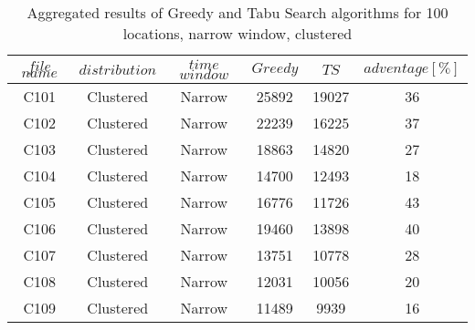\begin{table}[t]
\centering
\caption{
Aggregated results of Greedy and Tabu Search algorithms for 100 locations, narrow window, clustered}
\begin{tabular*}{0.8\linewidth}{@{\extracolsep{\fill}}cccccc}
\toprule
$file$ $name$ & $distribution$ & $time$ $window$ & $Greedy$ & $TS$ & $adventage[\%]$ \\ \midrule
C101 & Clustered & Narrow & 25892 & 19027 & 36\\
C102 & Clustered & Narrow & 22239 & 16225 & 37\\
C103 & Clustered & Narrow & 18863 & 14820 & 27\\
C104 & Clustered & Narrow & 14700 & 12493 & 18\\
C105 & Clustered & Narrow & 16776 & 11726 & 43\\
C106 & Clustered & Narrow & 19460 & 13898 & 40\\
C107 & Clustered & Narrow & 13751 & 10778 & 28\\
C108 & Clustered & Narrow & 12031 & 10056 & 20\\
C109 & Clustered & Narrow & 11489 & 9939 & 16\\
\end{tabular*}\end{table}